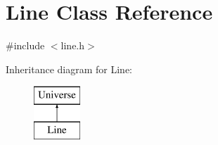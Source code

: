 \hypertarget{classLine}{}\section{Line Class Reference}
\label{classLine}


{\ttfamily \#include $<$line.\+h$>$}

Inheritance diagram for Line\+:\begin{figure}[H]
\begin{center}
\leavevmode
\includegraphics[height=2.000000cm]{classLine}
\end{center}
\end{figure}
